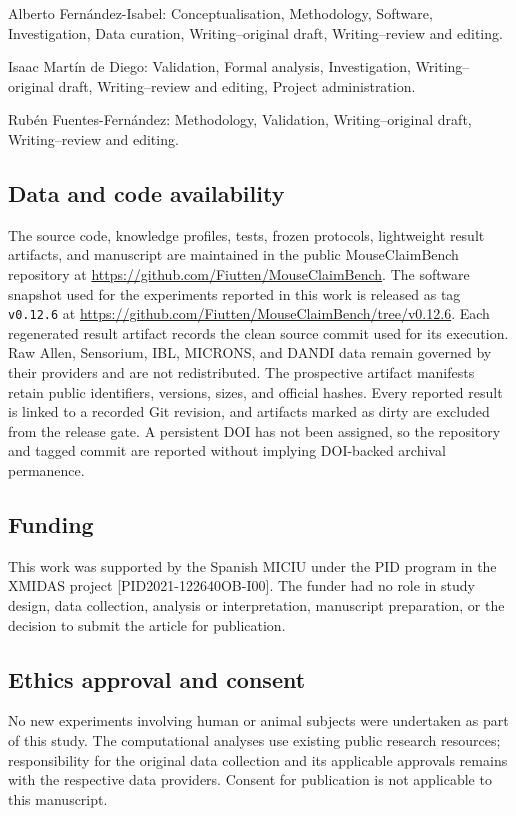 \documentclass[11pt,a4paper]{article}
\begin{document}
\noindent
Alberto Fern\'andez-Isabel:
Conceptualisation, Methodology, Software, Investigation, Data curation,
Writing--original draft, Writing--review and editing.
\par

\noindent
Isaac Mart\'in de Diego:
Validation, Formal analysis, Investigation, Writing--original draft,
Writing--review and editing, Project administration.
\par

\noindent
Rub\'en Fuentes-Fern\'andez:
Methodology, Validation, Writing--original draft, Writing--review and editing.

\subsection*{Data and code availability}
\label{sec:data-code-availability}
The source code, knowledge profiles, tests, frozen protocols, lightweight
result artifacts, and manuscript are maintained in the public MouseClaimBench
repository at
\url{https://github.com/Fiutten/MouseClaimBench}.
The software snapshot used for the experiments reported in this work is
released as tag \texttt{v0.12.6} at
\url{https://github.com/Fiutten/MouseClaimBench/tree/v0.12.6}.
Each regenerated result artifact records the clean source commit used for its
execution. Raw Allen, Sensorium, IBL, MICRONS, and DANDI data remain governed
by their providers and are not redistributed. The prospective artifact
manifests retain public identifiers, versions, sizes, and official hashes.
Every reported result is linked to a recorded Git revision, and artifacts
marked as dirty are excluded from the release gate. A persistent DOI has not
been assigned, so the repository and tagged commit are reported without
implying DOI-backed archival permanence.

\subsection*{Funding}
\label{sec:funding}

This work was supported by the Spanish MICIU under the PID program in the
XMIDAS project [PID2021-122640OB-I00]. The funder had no role in study design,
data collection, analysis or interpretation, manuscript preparation, or the
decision to submit the article for publication.


\subsection*{Ethics approval and consent}
No new experiments involving human or animal subjects were undertaken as part of this study. The computational analyses use existing public research resources; responsibility for the original data collection and its applicable approvals remains with the respective data providers. Consent for publication is not applicable to this manuscript.

\setlength{\bibsep}{2pt}


\end{document}
